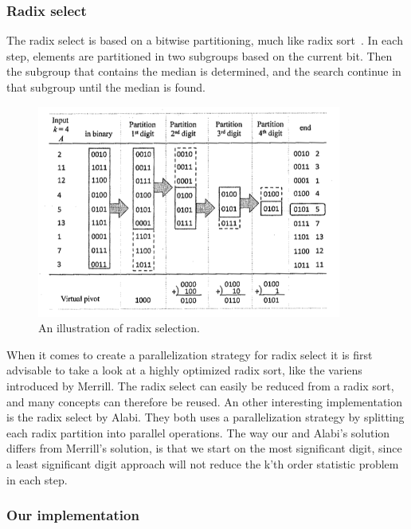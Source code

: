 \subsubsection{Radix select} %
\label{ssub:radix_select}

The radix select is based on a bitwise partitioning, much like radix sort~\cite[Chapter 8.3]{Cormen:2001}. In each step, elements are partitioned in two subgroups based on the current bit. Then the subgroup that contains the median is determined, and the search continue in that subgroup until the median is found.

\begin{figure}[ht!]
\centering
\includegraphics[width=100mm]{../gfx/Radix_select.png}

\caption{An illustration of radix selection\cite{cayman:2012}.}
\label{fig:radix_select}
\end{figure}

When it comes to create a parallelization strategy for radix select it is first advisable to take a look at a highly optimized radix sort, like the variens introduced by Merrill\cite{MerrillG11}. The radix select can easily be reduced from a radix sort, and many concepts can therefore be reused. An other interesting implementation is the radix select by Alabi\citep{Alabi:2012}. They both uses a parallelization strategy by splitting each radix partition into parallel operations. The way our and Alabi's solution differs from Merrill's solution, is that we start on the most significant digit, since a least significant digit approach will not reduce the k'th order statistic problem in each step.

\subsubsection{Our implementation} %
\label{ssub:our_implementation}

